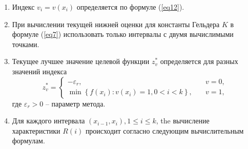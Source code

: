 \documentclass[10pt,a4paper]{book}
\begin{document}
\begin{enumerate}[itemsep=0pt,parsep=2pt,topsep=2pt,partopsep=0pt]
  \item Индекс $v_i=v(x_i)$ определяется по формуле (\ref{eq12}).
  \item При вычислении текущей нижней оценки для константы Гельдера $K$ в формуле (\ref{eq7}) использовать только интервалы с двумя вычислимыми точками.
  \item Текущее лучшее значение целевой функции $z_v^*$ определяется для разных значений индекса
\begin{equation}\label{eq20} 
z_v^*=
  \begin{cases}
    -\varepsilon _r, & {\quad v=0 ,}\\
    \min \left\{ f(x_i): v(x_i)=1, 0 < i < k \right\}, & {\quad v=1 ,}
  \end{cases}
\end{equation}
где $\varepsilon _r > 0$ -- параметр метода.

  \item Для каждого интервала $(x_{i-1}, x_i), 1 \leq i \leq k$, the вычисление характеристики $R(i)$ происходит согласно следующим вычислительным формулам.
      

\end{enumerate}
\end{document}
